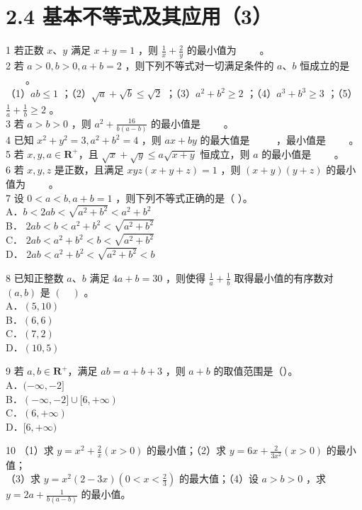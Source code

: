 \documentclass[10pt]{article}
\begin{document}
\section*{2.4 基本不等式及其应用（3）}
1 若正数 \(x 、 y\) 满足 \(x+y=1\) ，则 \(\frac{1}{x}+\frac{2}{y}\) 的最小值为 \(\qquad\)。\\
2 若 \(a>0, b>0, a+b=2\) ，则下列不等式对一切满足条件的 \(a 、 b\) 恒成立的是 \(\qquad\)。\\
（1）\(a b \leqslant 1\) ；（2）\(\sqrt{a}+\sqrt{b} \leqslant \sqrt{2}\) ；（3）\(a^{2}+b^{2} \geqslant 2\) ；（4）\(a^{3}+b^{3} \geqslant 3\) ；（5）\(\frac{1}{a}+\frac{1}{b} \geqslant 2\) 。\\
3 若 \(a>b>0\) ，则 \(a^{2}+\frac{16}{b(a-b)}\) 的最小值是 \(\qquad\)。\\
4 已知 \(x^{2}+y^{2}=3, a^{2}+b^{2}=4\) ，则 \(a x+b y\) 的最大值是 \(\qquad\) ，最小值是 \(\qquad\)。\\
5 若 \(x, y, a \in \mathbf{R}^{+}\)，且 \(\sqrt{x}+\sqrt{y} \leqslant a \sqrt{x+y}\) 恒成立，则 \(a\) 的最小值是 \(\qquad\)。\\
6 若 \(x, y, z\) 是正数，且满足 \(x y z(x+y+z)=1\) ，则 \((x+y)(y+z)\) 的最小值为 \(\qquad\)。\\
7 设 \(0<a<b, a+b=1\) ，则下列不等式正确的是（ ）。\\
A．\(b<2 a b<\sqrt{a^{2}+b^{2}}<a^{2}+b^{2}\)\\
B． \(2 a b<b<a^{2}+b^{2}<\sqrt{a^{2}+b^{2}}\)\\
C． \(2 a b<a^{2}+b^{2}<b<\sqrt{a^{2}+b^{2}}\)\\
D． \(2 a b<a^{2}+b^{2}<\sqrt{a^{2}+b^{2}}<b\)

8 已知正整数 \(a 、 b\) 满足 \(4 a+b=30\) ，则使得 \(\frac{1}{a}+\frac{1}{b}\) 取得最小值的有序数对 \((a, b)\) 是 \((\quad)\) 。\\
A．\((5,10)\)\\
B．\((6,6)\)\\
C．\((7,2)\)\\
D．\((10,5)\)

9 若 \(a, b \in \mathbf{R}^{+}\)，满足 \(a b=a+b+3\) ，则 \(a+b\) 的取值范围是（）。\\
A．\((-\infty,-2]\)\\
B．\((-\infty,-2] \cup[6,+\infty)\)\\
C．\((6,+\infty)\)\\
D．\([6,+\infty)\)

10 （1）求 \(y=x^{2}+\frac{2}{x}(x>0)\) 的最小值；（2）求 \(y=6 x+\frac{2}{3 x^{2}}(x>0)\) 的最小值；\\
（3）求 \(y=x^{2}(2-3 x)\left(0<x<\frac{2}{3}\right)\) 的最大值；（4）设 \(a>b>0\) ，求 \(y=2 a+\frac{1}{b(a-b)}\) 的最小值。
\end{document}
